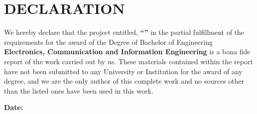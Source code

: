 
\chapter*{DECLARATION}
{}

\noindent We hereby declare that the project entitled, \textbf{``\cTitle''} in the partial fulfillment  of the requirements for the award of the Degree of Bachelor of Engineering \textbf{Electronics, Communication and Information Engineering} is a bona fide report of the work carried out by us. These materials contained within the report have not been submitted to any University or Institution for the award of any degree, and we are the only author of this complete work and no sources other than the listed ones have been used in this work.
\vspace{0.5cm}

\noindent \authorTable

\noindent \textbf{Date:} \cDate
